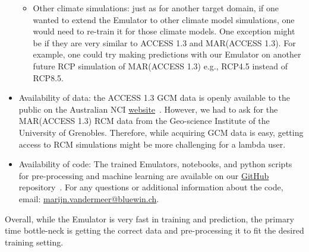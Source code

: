 \documentclass[a4paper,11pt,oneside]{report}
\begin{document}
\begin{itemize}
\begin{itemize}
        \item Other climate simulations: just as for another target domain, if one wanted to extend the Emulator to other climate model simulations, one would need to re-train it for those climate models. One exception might be if they are very similar to ACCESS 1.3 and MAR(ACCESS 1.3). For example, one could try making predictions with our Emulator on another future RCP simulation of MAR(ACCESS 1.3) e.g., RCP4.5 instead of RCP8.5.  
    \end{itemize}
    \item Availability of data: the ACCESS 1.3 GCM data is openly available to the public on the Australian NCI \href{https://esgf.nci.org.au/search/esgf-nci/}{website}~\cite{NCI}. However, we had to ask for the MAR(ACCESS 1.3) RCM data from the Geo-science Institute of the University of Grenobles. Therefore, while acquiring GCM data is easy, getting access to RCM simulations might be more challenging for a lambda user.
    \item Availability of code: The trained Emulators, notebooks, and python scripts for pre-processing and machine learning are available on our \href{https://github.com/marvande/master-thesis}{GitHub} repository~\cite{GitHub}. For any questions or additional information about the code, email: \href{mailto:marijn.vandermeer@bluewin.ch}{marijn.vandermeer@bluewin.ch}. 
\end{itemize}
Overall, while the Emulator is very fast in training and prediction, the primary time bottle-neck is getting the correct data and pre-processing it to fit the desired training setting.  


\end{document}
